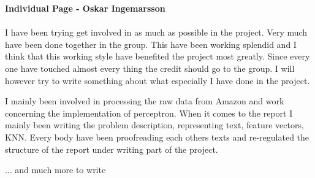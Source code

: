 \newpage
\textbf{Individual Page - Oskar Ingemarsson} \\\\
I have been trying get involved in as much as possible in the project.
Very much have been done together in the group. This have been working
splendid and I think that this working style have benefited the project most
greatly. Since every one have touched almost every thing the credit should go to
the group. I will however try to write something about what especially I have
done in the project.

I mainly been involved in processing the raw data from Amazon and work
concerning the implementation of perceptron. When it comes to the report I
mainly been writing the problem description, representing text, feature vectors,
KNN. Every body have been proofreading each others texts and re-regulated the
structure of the report under writing part of the project.

... and much more to write



